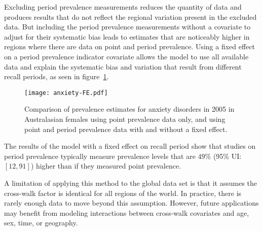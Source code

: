 Excluding period prevalence measurements reduces the quantity of data
and produces results that do not reflect the regional variation
present in the excluded data.  But including the period prevalence
measurements without a covariate to adjust for their systematic bias
leads to estimates that are noticeably higher in regions where there
are data on point and period prevalence.  Using a fixed effect on a
period prevalence indicator covariate allows the model to use all
available data and explain the systematic bias and variation that
result from different recall periods, as seen in
figure~\ref{fig:app-anxiety FE}.

    \begin{figure}[h]
        \begin{center}
            \texttt{[image: anxiety-FE.pdf]}
            \caption[Comparison of prevalence estimates of anxiety disorders 
              using different methods.]{Comparison of prevalence estimates for anxiety
              disorders in 2005 in Australasian females using point
              prevalence data only, and using point and period prevalence data
              with and without a fixed effect.}
            \label{fig:app-anxiety FE}
        \end{center}
    \end{figure}

The results of the model with a fixed effect on recall period show
that studies on period prevalence typically measure prevalence levels
that are $49$\% (95\% UI: $[12, 91]$) higher than if they measured point
prevalence.

A limitation of applying this method to the global data set is that it
assumes the cross-walk factor is identical for all regions of the
world.  In practice, there is rarely enough data to move beyond this
assumption.  However, future applications may benefit from modeling
interactions between cross-walk covariates and age, sex, time, or
geography.
